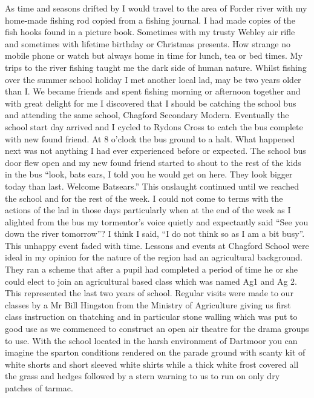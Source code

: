 
\here
As time and seasons drifted by I would travel to the area of Forder river with
my home-made fishing rod copied from a fishing journal. I had made copies of
the fish hooks found in a picture book.  Sometimes with my trusty Webley air
rifle and sometimes with lifetime birthday or Christmas presents.  How strange
no mobile phone or watch but always home in time for lunch, tea or bed times.
My trips to the river fishing taught me the dark side of human nature. Whilst
fishing over the summer school holiday I met another local lad, may be two
years older than I.  We became friends and spent fishing morning or afternoon
together and with great delight for me I discovered that I should be catching
the school bus and attending the same school, Chagford Secondary Modern.
Eventually the school start day arrived and I cycled to Rydons Cross to catch
the bus complete with new found friend.  At 8 o'clock the bus ground to a halt.
What happened next was not anything I had ever experienced before or expected.
The school bus door flew open and my new found friend started to shout to the
rest of the kids in the bus ``look, bats ears, I told you he would get on here.
They look bigger today than last.  Welcome Batsears.'' This onslaught continued
until we reached the school and for the rest of the week.  I could not come to
terms with the actions of the lad in those days particularly when at the end of
the week as I alighted from the bus my tormentor's voice quietly and
expectantly said ``See you down the river tomorrow''?  I think I said, ``I do
not think so as I am a bit busy''.  This unhappy event faded with time. Lessons
and events at Chagford School were ideal in my opinion for the nature of the
region had an agricultural background. They ran a scheme that after a pupil had
completed a period of time he or she could elect to join an agricultural based
class which was named Ag1 and Ag 2. This represented the last two years of
school. Regular visits were made to our classes by a Mr Bill Hingston from the
Ministry of Agriculture giving us first class instruction on thatching and in
particular stone walling which was put to good use as we commenced to construct
an open air theatre for the drama groups to use.  With the school located in
the harsh environment of Dartmoor you can imagine the sparton conditions
rendered on the parade ground with scanty kit of white shorts and short sleeved
white shirts while a thick white frost covered all the grass and hedges
followed by a stern warning to us to run on only dry patches of tarmac.
